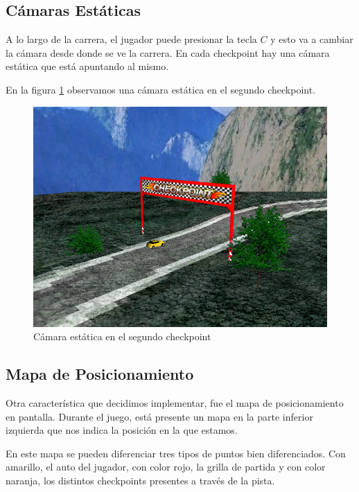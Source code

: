 \documentclass[a4paper,10pt]{article}
\begin{document}
\subsection{C\'amaras Est\'aticas}

A lo largo de la carrera, el jugador puede presionar la tecla $C$ y esto va a
cambiar la c\'amara desde donde se ve la carrera.  En cada checkpoint hay una
c\'amara est\'atica que est\'a apuntando al mismo.

En la figura \ref{fig:static} observamos una c\'amara est\'atica en el
segundo checkpoint.

\begin{figure}
 \centering
 \includegraphics[bb=0 0 640 480,scale=0.4,keepaspectratio=true]{./static.png}
 \caption{C\'amara est\'atica en el segundo checkpoint}
 \label{fig:static}
\end{figure}

\subsection{Mapa de Posicionamiento}

Otra caracter\'istica que decidimos implementar, fue el mapa de posicionamiento
en pantalla.  Durante el juego, est\'a presente un mapa en la parte inferior
izquierda que nos indica la posici\'on en la que estamos.

En este mapa se pueden diferenciar tres tipos de puntos bien diferenciados. 
Con amarillo, el auto del jugador, con color rojo, la grilla de partida y con
color naranja, los distintos checkpoints presentes a trav\'es de la pista.
\end{document}
